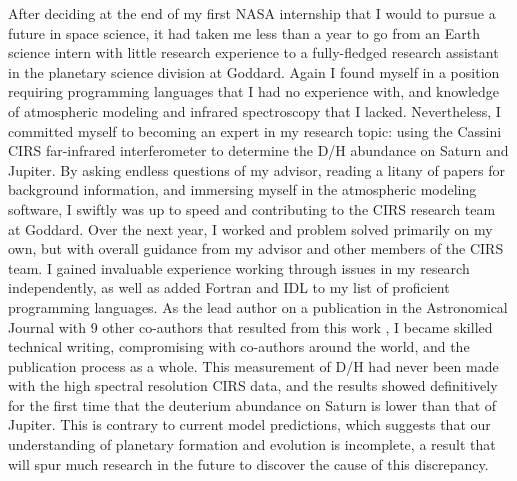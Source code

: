 After deciding at the end of my  first NASA internship that I would to
pursue a future in space science, it  had taken me less than a year to
go from an  Earth science intern with little research  experience to a
fully-fledged research assistant in  the planetary science division at
Goddard.  Again  I found  myself in  a position  requiring programming
languages that I had no  experience with, and knowledge of atmospheric
modeling  and infrared  spectroscopy that  I lacked.   Nevertheless, I
committed myself to becoming an expert in my research topic: using the
Cassini  CIRS   far-infrared  interferometer  to  determine   the  D/H
abundance on  Saturn and  Jupiter. By asking  endless questions  of my
advisor, reading  a litany of  papers for background  information, and
immersing myself in  the atmospheric modeling software,  I swiftly was
up  to   speed  and  contributing   to  the  CIRS  research   team  at
Goddard. Over the next year, I  worked and problem solved primarily on
my own, but with overall guidance from my advisor and other members of
the CIRS team.  I gained  invaluable experience working through issues
in my research  independently, as well as added Fortran  and IDL to my
list of  proficient programming  languages.  As the  lead author  on a
publication in the  Astronomical Journal with 9  other co-authors that
resulted  from   this  work  \citep{Pierel:2017},  I   became  skilled
technical writing, compromising with  co-authors around the world, and
the publication process as a whole.  This measurement of D/H had never
been made with the high spectral resolution CIRS data, and the results
showed definitively for the first time that the deuterium abundance on
Saturn is  lower than  that of  Jupiter. This  is contrary  to current
model predictions, which suggests  that our understanding of planetary
formation and  evolution is incomplete,  a result that will  spur much
research in the future to discover the cause of this discrepancy.


